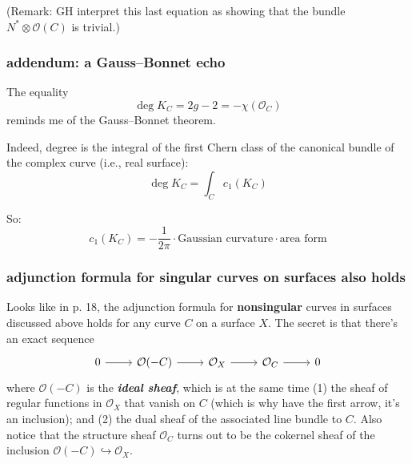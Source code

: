 (Remark: GH interpret this last equation as showing that the bundle \( N^* \otimes \mathcal{O}(C) \) is trivial.)


\subsubsection*{addendum: a Gauss–Bonnet echo}

The equality
\[
\deg K_C = 2g - 2 = -\chi(\mathcal{O}_C)
\]
reminds me of the Gauss–Bonnet theorem.

Indeed, degree is the integral of the first Chern class of the canonical bundle of the complex curve (i.e., real surface):
\[
\deg K_C = \int_C c_1(K_C)
\]

So:
\[
c_1(K_C) = -\frac{1}{2\pi} \cdot \text{Gaussian curvature} \cdot \text{area form}
\]
\subsubsection{adjunction formula for singular curves on surfaces also holds}

Looks like in \cite{huk} p. 18, the adjunction formula for \textbf{nonsingular}  curves in surfaces discussed above holds for any curve \(C\) on a surface \(X\). The secret is that there's an exact sequence
\[\begin{tikzcd}0\arrow[r]&\mathcal{O}(-C)\arrow[r]&\mathcal{O}_X\arrow[r]&\mathcal{O}_C\arrow[r]&0\end{tikzcd}\]
where \(\mathcal{O}(-C)\) is the \textit{\textbf{ideal sheaf}}, which is at the same time (1) the sheaf of regular functions in \(\mathcal{O}_X\) that vanish on \(C\) (which is why have the first arrow, it's an inclusion); and (2) the dual sheaf of the associated line bundle to \(C\). Also notice that the structure sheaf \(\mathcal{O}_C\) turns out to be the cokernel sheaf of the inclusion \(\mathcal{O}(-C) \hookrightarrow  \mathcal{O}_X\).

